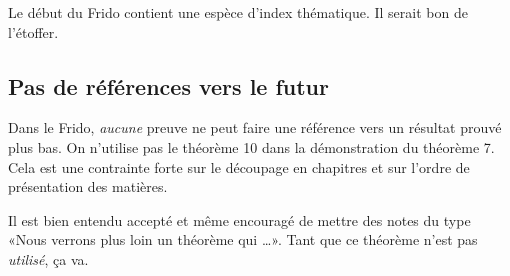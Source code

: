 Le début du Frido contient une espèce d'index thématique. Il serait bon de l'étoffer.

\subsection{Pas de références vers le futur}
\label{SUBooINTROpoliticsNoFutureRef}

Dans le Frido, \emph{aucune} preuve ne peut faire une référence vers un résultat prouvé plus bas. On n'utilise pas le théorème 10 dans la démonstration du théorème 7. Cela est une contrainte forte sur le découpage en chapitres et sur l'ordre de présentation des matières.

Il est bien entendu accepté et même encouragé de mettre des notes du type «Nous verrons plus loin un théorème qui \ldots». Tant que ce théorème n'est pas \emph{utilisé}, ça va.



